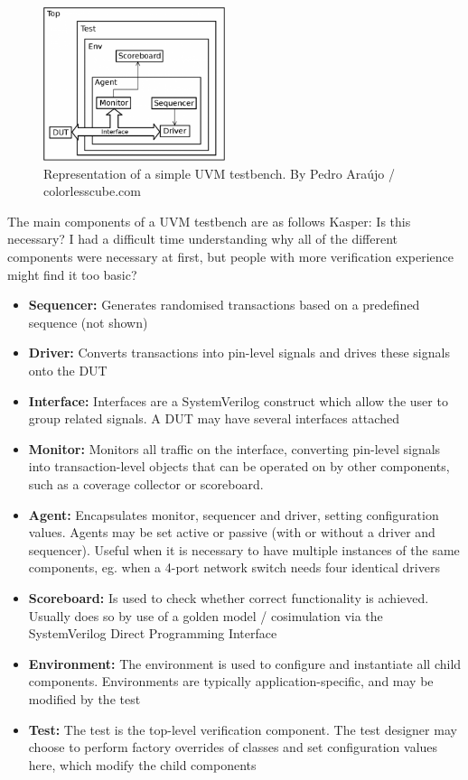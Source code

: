 \documentclass[a4paper, conference]{IEEEtran}
\newcommand{\kasper}[1]{{\color{purple} Kasper: #1}}
\begin{document}
\begin{figure}
    \centering
    \includegraphics[width=0.475\textwidth]{uvm-tb_Pedro-Araujo.png}
    \caption{Representation of a simple UVM testbench. By Pedro Araújo / colorlesscube.com}
    \label{fig:uvm_testbench}
\end{figure}

The main components of a UVM testbench are as follows
\kasper{Is this necessary? I had a difficult time understanding why all of the different components were necessary at first, but people with more verification experience might find it too basic?}
\begin{itemize}
    \item \textbf{Sequencer:} Generates randomised transactions based on a predefined sequence (not shown)
    \item \textbf{Driver:} Converts transactions into pin-level signals and drives these signals onto the DUT
    \item \textbf{Interface:} Interfaces are a SystemVerilog construct which allow the user to group related signals. A DUT may have several interfaces attached
    \item \textbf{Monitor:} Monitors all traffic on the interface, converting pin-level signals into transaction-level objects that can be operated on by other components, such as a coverage collector or scoreboard. 
    \item \textbf{Agent:} Encapsulates monitor, sequencer and driver, setting configuration values. Agents may be set active or passive (with or without a driver and sequencer). Useful when it is necessary to have multiple instances of the same components, eg. when a 4-port network switch needs four identical drivers
    \item \textbf{Scoreboard:} Is used to check whether correct functionality is achieved. Usually does so by use of a golden model / cosimulation via the SystemVerilog Direct Programming Interface
    \item \textbf{Environment:} The environment is used to configure and instantiate all child components. Environments are typically application-specific, and may be modified by the test
    \item \textbf{Test:} The test is the top-level verification component. The test designer may choose to perform factory overrides of classes and set configuration values here, which modify the child components
\end{itemize}
\end{document}
